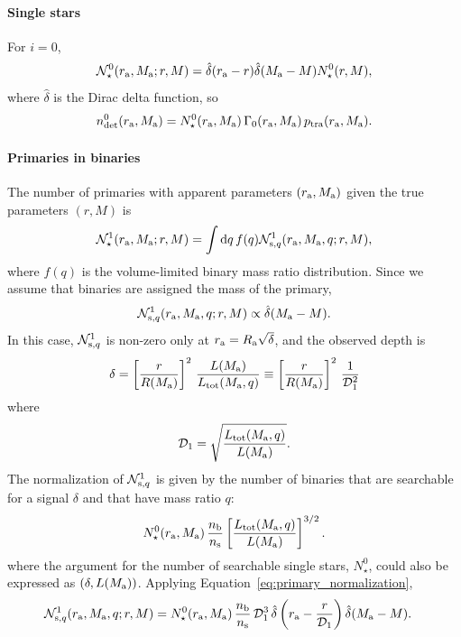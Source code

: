 \documentclass[12pt,modern]{aastex61}
\renewcommand{\a}{_{\rm a}}
\newcommand{\s}{_{\rm s}}
\renewcommand{\b}{_{\rm b}}
\begin{document}
\paragraph{Single stars} For $i=0$, 
\begin{equation}
    \mathcal{N}_\star^0(r\a,M\a; r,M)
    =\hat{\delta}(r\a-r)\hat{\delta}(M\a-M) N_\star^0(r,M),
\end{equation}
where $\hat{\delta}$ is the Dirac delta function, so
\begin{equation}
    n_{\rm det}^0(r\a, M\a)=N_\star^0(r\a,M\a)\, \Gamma_0(r\a, 
    M\a) \, p_{\rm tra}(r\a, M\a).
\end{equation}

\paragraph{Primaries in binaries}
The number of primaries with apparent parameters $(r\a,M\a)$ given the
true parameters $(r,M)$ is
\begin{equation}
    \mathcal{N}_\star^1(r\a, M\a; r, M)
    = \int 
      \mathrm{d}q\,f(q)\mathcal{N}_{{\rm s}, q}^1(r\a, M\a, q; r, M),
    \label{eq:fancyN_s_1}
\end{equation}
where $f(q)$ is the volume-limited binary mass ratio distribution.
Since we assume that binaries are assigned the mass of the primary,
\begin{equation}
    \mathcal{N}_{{\rm s},q}^1(r\a, M\a, q; r, M)
    \propto
    \hat{\delta}(M\a-M).
\end{equation}
In this case, $\mathcal{N}_{{\rm s},q}^1$ is non-zero only at
$r\a=R\a\sqrt{\delta}$, and the observed depth is
\begin{equation}
    \delta
    = \left[{r\over R(M\a)}\right]^2\, {L(M\a) \over L_{\rm tot}(M\a, q)}
    \equiv \left[{r\over R(M\a)}\right]^2\, 
    \frac{1}{\mathcal{D}_1^2}
    \label{eq:delta_obs_primaries} 
\end{equation}
where
\begin{equation}
    \mathcal{D}_1=\sqrt{L_{\rm tot}(M\a, q) \over L(M\a)}.
\end{equation}
The normalization of $\mathcal{N}_{{\rm s},q}^1$ is given by the
number of binaries that are searchable for a signal $\delta$
and that have mass ratio $q$:
\begin{equation}
    N_\star^0(r\a, M\a)\,
    {n\b\over n\s}\left[L_{\rm tot}(M\a, q) \over L(M\a)\right]^{3/2}.
    \label{eq:primary_normalization}
\end{equation}
where the argument for the number of searchable single stars,
$N_\star^0$, could also be expressed as $(\delta, L(M\a))$.
Applying Equation~\ref{eq:primary_normalization},
\begin{align}
    \mathcal{N}_{{\rm s}, q}^1(r\a, M\a, q; r, M)
    &=N_\star^0(r\a, M\a)
    \, {n\b\over n\s} \, \mathcal{D}_1^3
    \,\hat{\delta} \left(r\a-\frac{r}{\mathcal{D}_1}\right)\hat{\delta}(M\a-M).
    \label{eq:N_s_1}
\end{align}
\end{document}
